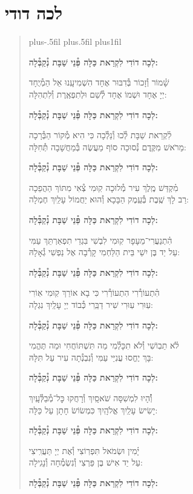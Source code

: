 \documentclass[twoside, openany, parskip=half, 11pt]{book}
\begin{document}
\section*{ לכה דודי }

\newcommand{\lechadodi}{\textbf{לְכָה דוֹדִי לִקְרַאת כַּלָּה פְּ֯נֵי שַׁבָּת נְ֯קַבְּ֯לָה:}}

\begin{quote}
\leftskip=0pt plus-.5fil
\rightskip=0pt plus.5fil
\parfillskip=0pt plus1fil


\lechadodi

שָׁ֗מוֹר וְ֯זָכוֹר בְּ֯דִבּוּר אֶחָד \hfill
הִשְׁמִיעָֽנוּ אֵל הַמְ֯יֻחָד \\
יְיָ אֶחָד וּשְׁמוֹ אֶחָד \hfill
לְ֯שֵׁם וּלְתִפְאֶֽרֶת וְ֯לִתְהִלָּה:

\lechadodi

לִ֗קְרַאת שַׁבָּת לְ֯כוּ וְ֯נֵלְ֯כָה \hfill
כִּי הִיא מְ֯קוֹר הַבְּ֯רָכָה \\
מֵרֹאשׁ מִקֶּֽדֶם נְ֯סוּכָה \hfill
סוֹף מַעֲשֶׂה בְּ֯מַחֲשָׁבָה תְּ֯חִלָּה:

\lechadodi

מִ֗קְדַּשׁ מֶֽלֶךְ עִיר מְ֯לוּכָה \hfill
קֽוּמִי צְ֯אִי מִתּוֹךְ הַהֲפֵכָה \\
רַב לָךְ שֶֽׁבֶת בְּ֯עֵֽמֶק הַבָּכָא \hfill
וְ֯הוּא יַחֲמוֹל עָלַֽיִךְ חֶמְלָה:

\lechadodi

הִ֗תְנַעֲרִי־מֵעָפָר קֽוּמִי \hfill
לִבְשִׁי בִּגְדֵי תִפְאַרְתֵּךְ עַמִּי \\
עַל יַד בֶּן יִשַׁי בֵּית הַלַּחְמִי \hfill
קָרְ֯בָה אֶל נַפְשִׁי גְ֯אָלָהּ:

\lechadodi

הִ֗תְעוֹרְ֯רִי הִתְעוֹרְ֯רִי \hfill
כִּי בָא אוֹרֵךְ קֽוּמִי אֽוֹרִי \\
עֽוּרִי עֽוּרִי שִׁיר דַבֵּֽרִי \hfill
כְּ֯בוֹד יְיָ עָלַֽיִךְ נִגְלָה:

\lechadodi

לֹ֗א תֵבֽוֹשִׁי וְ֯לֹא תִכָּלְ֯מִי \hfill
מַה תִּשְׁתּוֹחֲחִי וּמַה תֶּהֱמִי \\
בָּךְ יֶחֱסוּ עֲנִיֵּי עַמִּי \hfill
וְ֯נִבְנְ֯תָה עִיר עַל תִּלָּהּ:

\lechadodi

וְ֯֗הָיוּ לִמְשִׁסָּה שֹׁאסָֽיִךְ \hfill
וְ֯רָחֲקוּ כׇּל־מְ֯בַלְּ֯עָֽיִךְ \\
יָשִׂישׂ עָלַֽיִךְ אֱלֹהָֽיִךְ \hfill
כִּמְשׂוֹשׂ חָתָן עַל כַּלָּה:

\lechadodi

יָ֗מִין וּשְׂמֹאל תִּפְרֽוֹצִי \hfill
וְ֯אֶת יְיָ תַּעֲרִֽיצִי \\
עַל יַד אִישׁ בֶּן פַּרְצִי \hfill
וְ֯נִשְׂמְ֯חָה וְ֯נָגִֽילָה:

\lechadodi

\end{quote}
\end{document}
